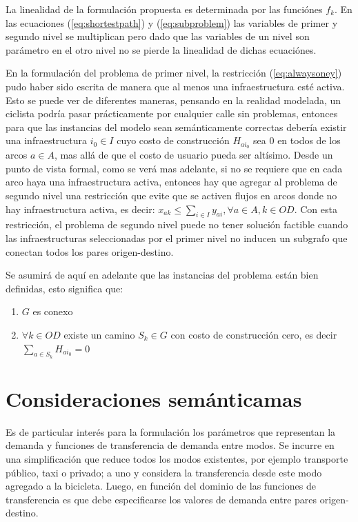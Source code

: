 \documentclass{article}
\begin{document}
  La linealidad de la formulación propuesta es determinada por las funciónes $f_k$. En las ecuaciones (\ref{eq:shortestpath}) y (\ref{eq:subproblem}) las variables de primer y segundo nivel se multiplican pero dado que las variables de un nivel son parámetro en el otro nivel no se pierde la linealidad de dichas ecuaciónes.

  En la formulación del problema de primer nivel, la restricción (\ref{eq:alwaysoney}) pudo haber sido escrita de manera que al menos una infraestructura esté activa. Esto se puede ver de diferentes maneras, pensando en la realidad modelada, un ciclista podría pasar prácticamente por cualquier calle sin problemas, entonces para que las instancias del modelo sean semánticamente correctas debería existir una infraestructura $i_0 \in I$ cuyo costo de construcción $H_{ai_0}$ sea 0 en todos de los arcos $a \in A$, mas allá de que el costo de usuario pueda ser altísimo. Desde un punto de vista formal, como se verá mas adelante, si no se requiere que en cada arco haya una infraestructura activa, entonces hay que agregar al problema de segundo nivel una restricción que evite que se activen flujos en arcos donde no hay infraestructura activa, es decir: $x_{ak} \leq \sum_{i \in I} y_{ai}, \forall a \in A, k \in OD$. Con esta restricción, el problema de segundo nivel puede no tener solución factible cuando las infraestructuras seleccionadas por el primer nivel no inducen un subgrafo que conectan todos los pares origen-destino.

  Se asumirá de aquí en adelante que las instancias del problema están bien definidas, esto significa que:

  \begin{enumerate}
    \item {$G$ es conexo}
    \item {$\forall k \in OD$ existe un camino $S_k \in G$ con costo de construcción cero, es decir $\sum_{a \in S_k} H_{ai_0} = 0$}
  \end{enumerate}

  \section*{Consideraciones semánticamas}

  Es de particular interés para la formulación los parámetros que representan la demanda y funciones de transferencia de demanda entre modos. Se incurre en una simplificación que reduce todos los modos existentes, por ejemplo transporte público, taxi o privado; a uno y considera la transferencia desde este modo agregado a la bicicleta. Luego, en función del dominio de las funciones de transferencia es que debe especificarse los valores de demanda entre pares origen-destino.
\end{document}
